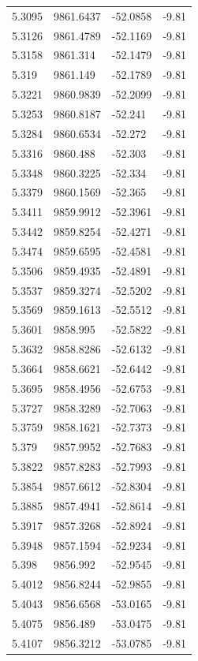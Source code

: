 \begin{table}[H]
\begin{tabular}{llll}
5.3095 & 9861.6437 & -52.0858 & -9.81 \\
5.3126 & 9861.4789 & -52.1169 & -9.81 \\
5.3158 & 9861.314 & -52.1479 & -9.81 \\
5.319 & 9861.149 & -52.1789 & -9.81 \\
5.3221 & 9860.9839 & -52.2099 & -9.81 \\
5.3253 & 9860.8187 & -52.241 & -9.81 \\
5.3284 & 9860.6534 & -52.272 & -9.81 \\
5.3316 & 9860.488 & -52.303 & -9.81 \\
5.3348 & 9860.3225 & -52.334 & -9.81 \\
5.3379 & 9860.1569 & -52.365 & -9.81 \\
5.3411 & 9859.9912 & -52.3961 & -9.81 \\
5.3442 & 9859.8254 & -52.4271 & -9.81 \\
5.3474 & 9859.6595 & -52.4581 & -9.81 \\
5.3506 & 9859.4935 & -52.4891 & -9.81 \\
5.3537 & 9859.3274 & -52.5202 & -9.81 \\
5.3569 & 9859.1613 & -52.5512 & -9.81 \\
5.3601 & 9858.995 & -52.5822 & -9.81 \\
5.3632 & 9858.8286 & -52.6132 & -9.81 \\
5.3664 & 9858.6621 & -52.6442 & -9.81 \\
5.3695 & 9858.4956 & -52.6753 & -9.81 \\
5.3727 & 9858.3289 & -52.7063 & -9.81 \\
5.3759 & 9858.1621 & -52.7373 & -9.81 \\
5.379 & 9857.9952 & -52.7683 & -9.81 \\
5.3822 & 9857.8283 & -52.7993 & -9.81 \\
5.3854 & 9857.6612 & -52.8304 & -9.81 \\
5.3885 & 9857.4941 & -52.8614 & -9.81 \\
5.3917 & 9857.3268 & -52.8924 & -9.81 \\
5.3948 & 9857.1594 & -52.9234 & -9.81 \\
5.398 & 9856.992 & -52.9545 & -9.81 \\
5.4012 & 9856.8244 & -52.9855 & -9.81 \\
5.4043 & 9856.6568 & -53.0165 & -9.81 \\
5.4075 & 9856.489 & -53.0475 & -9.81 \\
5.4107 & 9856.3212 & -53.0785 & -9.81 \\

\end{tabular}
\end{table}
